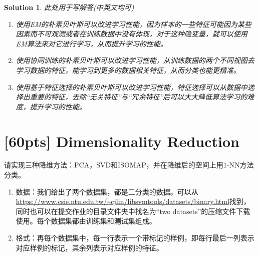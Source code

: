 \documentclass[a4paper,UTF8]{article}
\numberwithin{equation}{section}
\newtheorem*{solution}{Solution}
\begin{document}
\begin{solution}
此处用于写解答(中英文均可)\\
\begin{enumerate}
    \item 使用EM的朴素贝叶斯可以改进学习性能，因为样本的一些特征可能因为某些因素而不可观测或者在训练数据中没有体现，对于这种隐变量，就可以使用EM算法来对它进行学习，从而提升学习的性能。
    \item 使用协同训练的朴素贝叶斯可以改进学习性能，从训练数据的两个不同视图去学习数据的特征，能学习到更多的数据相关特征，从而分类也能更精准。
    \item 使用基于特征选择的朴素贝叶斯可以改进学习性能，特征选择可以从数据中选择出重要的特征，去除“无关特征”与“冗余特征”后可以大大降低算法学习的难度，提升学习的性能。
\end{enumerate}
\end{solution}
\newpage

\section{[60pts] Dimensionality Reduction}
请实现三种降维方法：PCA，SVD和ISOMAP，并在降维后的空间上用$1$-NN方法分类。
\begin{enumerate}
	\item 数据：我们给出了两个数据集，都是二分类的数据。可以从\url{https://www.csie.ntu.edu.tw/~cjlin/libsvmtools/datasets/binary.html}找到，同时也可以在提交作业的目录文件夹中找名为“two datasets”的压缩文件下载使用。每个数据集都由训练集和测试集组成。
	\item 格式：再每个数据集中，每一行表示一个带标记的样例，即每行最后一列表示对应样例的标记，其余列表示对应样例的特征。
\end{enumerate}
\end{document}
